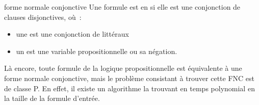 \begin{definition}{}{forme normale conjonctive}
    Une formule est en  si elle est une conjonction de clauses disjonctives, où~:
    \begin{itemize}
        \item une  est une conjonction de littéraux
        \item un  est une variable propositionnelle ou sa négation.
    \end{itemize}
\end{definition}

\begin{remarque}{}{}
    Là encore, toute formule de la logique propositionnelle est équivalente à une forme normale conjonctive, mais le problème consistant à trouver cette FNC est de classe P. En effet, il existe un algorithme la trouvant en temps polynomial en la taille de la formule d'entrée.
\end{remarque}

    





